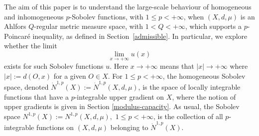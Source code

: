\documentclass[10pt]{amsart}
\numberwithin{equation}{section}
\begin{document}
 The aim of this paper is to understand the large-scale behaviour of homogeneous and inhomogeneous $p$-Sobolev functions, with $1\le p<+\infty$, when $(X,d,\mu)$ is an Ahlfors $Q$-regular metric measure space, with $1<Q<+\infty$, which supports a $p$-Poincar\'e inequality, as defined in Section~\ref{admissible}.  In particular, we explore whether the limit 
 \begin{equation}\label{eq1-2805}
		\lim_{x\to{+\infty}} u(x)
	\end{equation}
 exists for such Sobolev functions $u$.  Here  $x\to{+\infty}$ means that $|x|\to{+\infty}$ where $|x|:=d(O,x)$ for a given $O\in X$. 
 For $1\le p<+\infty$, the homogeneous Sobolev space, denoted $\dot N^{1,p}(X):=\dot N^{1,p}(X,d,\mu)$, is the space of locally integrable  functions that have a $p$-integrable  upper gradient on $X$, where the notion of upper gradients is given in Section \ref{modulus-capacity}.  As usual, the Sobolev space  $N^{1,p}(X):=N^{1,p}(X,d,\mu),$ $1\le p<+\infty$, is the collection of all $p$-integrable functions on $(X,d,\mu)$ belonging to $\dot  N^{1,p}(X)$.
 
\end{document}
